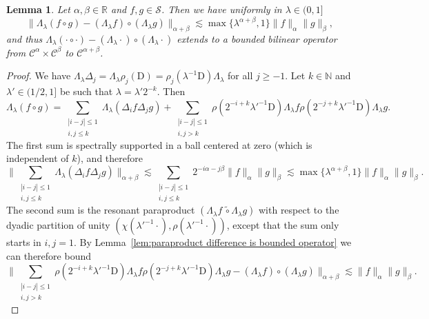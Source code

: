 \documentclass[11pt,a4paper]{article}
\newcommand{\mathD}{\mathrm{D}}
\newtheorem{lemma}[theorem]{Lemma}
\theoremstyle{remark}
\newcommand{\R}{\mathbb{R}}
\newcommand{\N}{\mathbb{N}}
\newcommand{\CC}{\ensuremath{\mathscr{C}}}
\newcommand{\CS}{\ensuremath{\mathscr{S}}}
\begin{document}
\begin{lemma}\label{lem:scaling commutator}
   Let $\alpha, \beta \in \R$ and $f, g \in \CS$. Then we have uniformly in $\lambda \in (0,1]$
   \[
      \| \Lambda_\lambda(f\circ g) - (\Lambda_\lambda f) \circ (\Lambda_\lambda g) \|_{\alpha+\beta} \lesssim \max\{\lambda^{\alpha+\beta}, 1\} \| f \|_\alpha \|g\|_\beta,
   \]
   and thus $ \Lambda_\lambda(\cdot\circ \cdot) - (\Lambda_\lambda \cdot) \circ (\Lambda_\lambda \cdot)$ extends to a bounded bilinear operator from $\CC^\alpha \times \CC^\beta$ to $\CC^{\alpha+\beta}$.
\end{lemma}
\begin{proof}
   We have $\Lambda_\lambda \Delta_j = \Lambda_\lambda \rho_j(\mathD) = \rho_j(\lambda^{-1} \mathD) \Lambda_\lambda$ for all $j \geqslant -1$. Let $k \in \N$ and $\lambda' \in (1/2,1]$ be such that $\lambda = \lambda' 2^{-k}$. Then
   \begin{equation}\label{eq:scaling commutator pr1}
      \Lambda_\lambda (f \circ g) = \sum_{\substack{|i-j| \leqslant 1 \\ i,j \leqslant k}} \Lambda_\lambda ( \Delta_i f \Delta_j g) + \sum_{\substack{|i-j| \leqslant 1 \\ i,j > k}} \rho(2^{-i+k} \lambda'^{-1} \mathD) \Lambda_\lambda f \rho(2^{-j+k} \lambda'^{-1} \mathD) \Lambda_\lambda g.
   \end{equation}
   The first sum is spectrally supported in a ball centered at zero (which is independent of $k$), and therefore
   \[
      \bigg\|  \sum_{\substack{|i-j| \leqslant 1 \\ i,j \leqslant k}} \Lambda_\lambda ( \Delta_i f \Delta_j g) \bigg\|_{\alpha + \beta} \lesssim \sum_{\substack{|i-j| \leqslant 1 \\ i,j \leqslant k}} 2^{-i \alpha -j\beta} \|f\|_\alpha \|g\|_\beta \lesssim \max\{\lambda^{\alpha+\beta},1\} \|f\|_\alpha \|g\|_\beta.
   \]
   The second sum is the resonant paraproduct $(\Lambda_\lambda f \, \widetilde{\circ} \Lambda_\lambda g)$ with respect to the dyadic partition of unity $(\chi(\lambda'^{-1} \cdot), \rho(\lambda'^{-1}\cdot))$, except that the sum only starts in $i,j =1$. By Lemma~\ref{lem:paraproduct difference is bounded operator} we can therefore bound
   \[
      \bigg\| \sum_{\substack{|i-j| \leqslant 1 \\ i,j > k}} \rho(2^{-i+k} \lambda'^{-1} \mathD) \Lambda_\lambda f \rho(2^{-j+k} \lambda'^{-1} \mathD) \Lambda_\lambda g - (\Lambda_\lambda f) \circ (\Lambda_\lambda g) \bigg\|_{\alpha+\beta} \lesssim \|f \|_\alpha \|g\|_\beta.
   \]
\end{proof}
\end{document}
